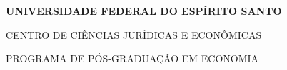 \documentclass[12pt,a4paper,oneside,english,brazil,
  chapter=TITLE,section=TITLE,        %
  sumario=abnt-6027-2012]{abntex2}
\renewcommand{\ABNTEXchapterfont}{\sffamily\bfseries}
\renewcommand{\imprimircapa}{%
  \begin{capa}%
    \center
    {\ABNTEXchapterfont\large\MakeUppercase{Universidade Federal do Espírito Santo}\par
     \MakeUppercase{Centro de Ciências Jurídicas e Econômicas}\par
     \MakeUppercase{Programa de Pós-Graduação em Economia}\par}
    \vspace*{2.5cm}
    {\ABNTEXchapterfont\large\MakeUppercase{\imprimirautor}\par}
    \vfill
    {\ABNTEXchapterfont\bfseries\Large\imprimirtitulo\par}
    \vfill
    {\large\MakeUppercase{\imprimirlocal}}\par
    {\large\imprimirdata}
    \vspace*{1cm}
  \end{capa}}
\begin{document}
\frenchspacing

\pretextual
\imprimircapa
\imprimirfolhaderosto



\renewcommand*{\cftsectionfont}{\mdseries}
\renewcommand*{\cftsectionpagefont}{\mdseries}
\begingroup
\let\ABNTEXoldcontentsline\contentsline
\renewcommand{\contentsline}[4]{%
  \ifstrequal{#1}{section}%
    {\ABNTEXoldcontentsline{#1}{\MakeTextUppercase{#2}}{#3}{#4}}%
    {\ABNTEXoldcontentsline{#1}{#2}{#3}{#4}}}
\tableofcontents*
\endgroup
\cleardoublepage

\textual







\postextual


\begin{apendicesenv}
\partapendices


\end{apendicesenv}
\end{document}
